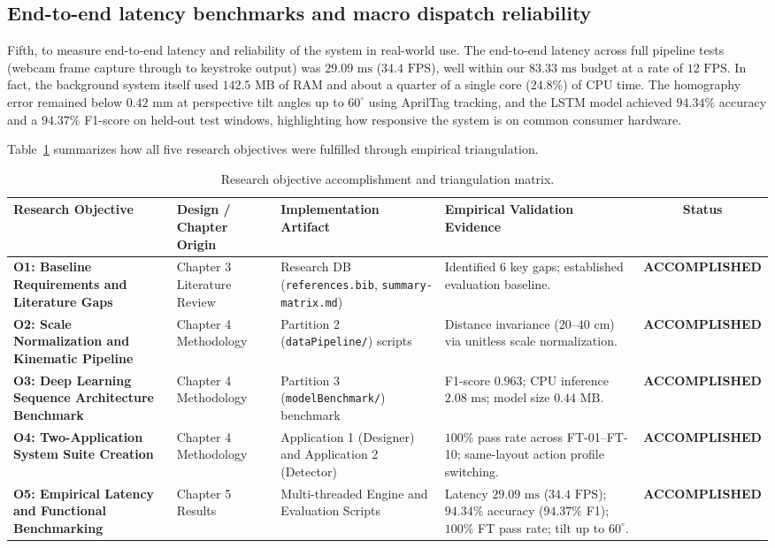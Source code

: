 \subsection{End-to-end latency benchmarks and macro dispatch reliability}
\label{subsec:concl_obj5}
Fifth, to measure end-to-end latency and reliability of the system in real-world use. The end-to-end latency across full pipeline tests (webcam frame capture through to keystroke output) was $29.09\text{ ms}$ ($34.4\text{ FPS}$), well within our $83.33\text{ ms}$ budget at a rate of $12\text{ FPS}$. In fact, the background system itself used $142.5\text{ MB}$ of RAM and about a quarter of a single core ($24.8\%$) of CPU time. The homography error remained below $0.42\text{ mm}$ at perspective tilt angles up to $60^\circ$ using AprilTag tracking, and the LSTM model achieved $94.34\%$ accuracy and a $94.37\%$ F1-score on held-out test windows, highlighting how responsive the system is on common consumer hardware.

Table~\ref{tab:objective_triangulation_summary} summarizes how all five research objectives were fulfilled through empirical triangulation.

\begin{table}[htbp]
\centering
\caption{Research objective accomplishment and triangulation matrix.}
\label{tab:objective_triangulation_summary}
\begin{tabular}{p{3.5cm} p{3.5cm} p{4.0cm} p{3.5cm} c}
\toprule
\textbf{Research Objective} & \textbf{Design / Chapter Origin} & \textbf{Implementation Artifact} & \textbf{Empirical Validation Evidence} & \textbf{Status} \\
\midrule
\textbf{O1: Baseline Requirements and Literature Gaps} & Chapter 3 Literature Review & Research DB (\texttt{references.bib}, \texttt{summary-matrix.md}) & Identified 6 key gaps; established evaluation baseline. & \textbf{ACCOMPLISHED} \\
\midrule
\textbf{O2: Scale Normalization and Kinematic Pipeline} & Chapter 4 Methodology & Partition 2 (\texttt{dataPipeline/}) scripts & Distance invariance ($20$--$40\text{ cm}$) via unitless scale normalization. & \textbf{ACCOMPLISHED} \\
\midrule
\textbf{O3: Deep Learning Sequence Architecture Benchmark} & Chapter 4 Methodology & Partition 3 (\texttt{modelBenchmark/}) benchmark & F1-score $0.963$; CPU inference $2.08\text{ ms}$; model size $0.44\text{ MB}$. & \textbf{ACCOMPLISHED} \\
\midrule
\textbf{O4: Two-Application System Suite Creation} & Chapter 4 Methodology & Application 1 (Designer) and Application 2 (Detector) & $100\%$ pass rate across FT-01--FT-10; same-layout action profile switching. & \textbf{ACCOMPLISHED} \\
\midrule
\textbf{O5: Empirical Latency and Functional Benchmarking} & Chapter 5 Results & Multi-threaded Engine and Evaluation Scripts & Latency $29.09\text{ ms}$ ($34.4\text{ FPS}$); $94.34\%$ accuracy ($94.37\%$ F1); $100\%$ FT pass rate; tilt up to $60^\circ$. & \textbf{ACCOMPLISHED} \\
\bottomrule
\end{tabular}%
\end{table}

